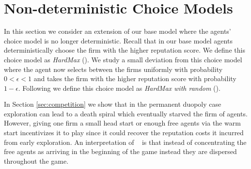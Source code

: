 \documentclass[../competing_bandits.tex]{subfiles}
\begin{document}
\section{Non-deterministic Choice Models}\label{sec:non_greedy}


In this section we consider an extension of our base model where the agents' choice model is no longer deterministic. Recall that in our base model agents deterministically choose the firm with the higher reputation score. We define this choice model as \textit{HardMax} (\HM). We study a small deviation from this choice model where the agent now selects between the firms uniformly with probability $0 < \epsilon < 1$ and takes the firm with the higher reputation score with probability $1 - \epsilon$. Following \cite{mansour2018competing} we define this choice model as \textit{HardMax with random} (\HMR).

In Section \ref{sec:competition} we show that in the permanent duopoly case exploration can lead to a death spiral which eventually starved the firm of agents. However, giving one firm a small head start or enough free agents via the warm start incentivizes it to play \TS since it could recover the reputation costs it incurred from early exploration. An interpretation of \HMR~ is that instead of concentrating the free agents as arriving in the beginning of the game instead they are dispersed throughout the game.
\end{document}

